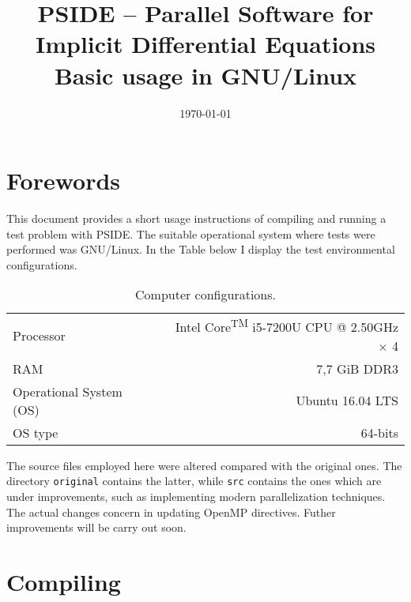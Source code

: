 \documentclass[a4paper,11pt]{article}
\title{{\LARGE \textbf{PSIDE -- Parallel Software for Implicit Differential Equations}}\\ 
{Basic usage in GNU/Linux}
 }%
\date{\today}
\theoremstyle{comm}
\begin{document}
\maketitle


\section{Forewords}

This document provides a short usage instructions of compiling and running a test problem with PSIDE. The suitable operational system where tests were performed was GNU/Linux. In the Table below I display the test environmental configurations.

\begin{table}[h]
\centering
{\fontsize{10}{12}\selectfont
\begin{tabular}{l | r} \toprule \toprule
Processor 	&  Intel\textsuperscript{\tiny{\textregistered}} Core\textsuperscript{\tiny{TM}} i5-7200U CPU @ 2.50GHz $\times$ 4  \\[0.3em] 
RAM &  7,7 GiB DDR3 \\[0.3em] 
Operational System (OS) &  Ubuntu 16.04 LTS \\[0.3em]
OS type &  64-bits \\
\bottomrule \bottomrule
\end{tabular}}
\caption{Computer configurations.}\label{pcconfig}
\end{table}

The source files employed here were altered compared with the original ones. The directory \texttt{original} contains the latter, while \texttt{src} contains the ones which are under improvements, such as implementing modern parallelization techniques. The actual changes concern in updating OpenMP directives. Futher improvements will be carry out soon.

\section{Compiling}
\end{document}
